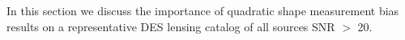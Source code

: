 In this section we discuss the importance of quadratic shape measurement 
bias results on a representative DES lensing catalog of 
all sources SNR $>$ 20. 

